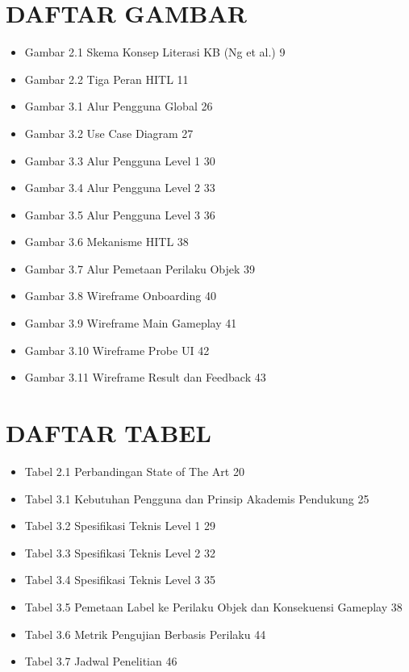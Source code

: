 \documentclass[12pt,oneside]{report}
\begin{document}
\chapter*{DAFTAR GAMBAR}

\begin{itemize}
\item Gambar 2.1 Skema Konsep Literasi KB (Ng et al.) \hfill 9
\item Gambar 2.2 Tiga Peran HITL \hfill 11
\item Gambar 3.1 Alur Pengguna Global \hfill 26
\item Gambar 3.2 Use Case Diagram \hfill 27
\item Gambar 3.3 Alur Pengguna Level 1 \hfill 30
\item Gambar 3.4 Alur Pengguna Level 2 \hfill 33
\item Gambar 3.5 Alur Pengguna Level 3 \hfill 36
\item Gambar 3.6 Mekanisme HITL \hfill 38
\item Gambar 3.7 Alur Pemetaan Perilaku Objek \hfill 39
\item Gambar 3.8 Wireframe Onboarding \hfill 40
\item Gambar 3.9 Wireframe Main Gameplay \hfill 41
\item Gambar 3.10 Wireframe Probe UI \hfill 42
\item Gambar 3.11 Wireframe Result dan Feedback \hfill 43
\end{itemize}

\newpage


\chapter*{DAFTAR TABEL}

\begin{itemize}
\item Tabel 2.1 Perbandingan State of The Art \hfill 20
\item Tabel 3.1 Kebutuhan Pengguna dan Prinsip Akademis Pendukung \hfill 25
\item Tabel 3.2 Spesifikasi Teknis Level 1 \hfill 29
\item Tabel 3.3 Spesifikasi Teknis Level 2 \hfill 32
\item Tabel 3.4 Spesifikasi Teknis Level 3 \hfill 35
\item Tabel 3.5 Pemetaan Label ke Perilaku Objek dan Konsekuensi Gameplay \hfill 38
\item Tabel 3.6 Metrik Pengujian Berbasis Perilaku \hfill 44
\item Tabel 3.7 Jadwal Penelitian \hfill 46
\end{itemize}
\end{document}
